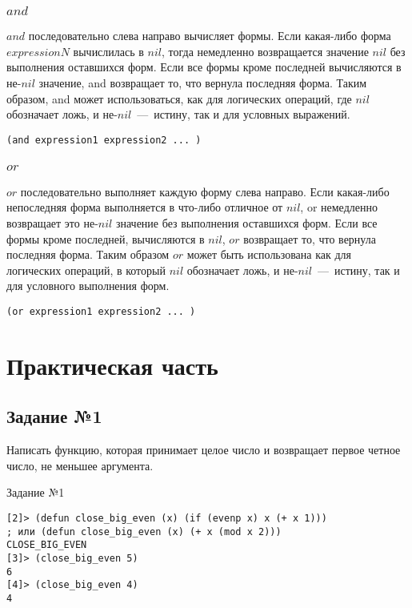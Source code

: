 \subsection{$and$}
$and$ последовательно слева направо вычисляет формы. Если какая-либо форма $expressionN$ вычислилась в $nil$, тогда немедленно возвращается значение $nil$ без выполнения оставшихся форм. Если все формы кроме последней вычисляются в не-$nil$ значение, and возвращает то, что вернула последняя форма. Таким образом, and может использоваться, как для логических операций, где $nil$ обозначает ложь, и не-$nil$~---~истину, так и для условных выражений.

\begin{code}
\begin{verbatim}
(and expression1 expression2 ... )
\end{verbatim}
\end{code}

\subsection{$or$}
$or$ последовательно выполняет каждую форму слева направо. Если какая-либо непоследняя форма выполняется в что-либо отличное от $nil$, or немедленно возвращает это не-$nil$ значение без выполнения оставшихся форм. Если все формы кроме последней, вычисляются в $nil$, $or$ возвращает то, что вернула последняя форма. Таким образом $or$ может быть использована как для логических операций, в который $nil$ обозначает ложь, и не-$nil$~---~истину, так и для условного выполнения форм.

\begin{code}
\begin{verbatim}
(or expression1 expression2 ... )
\end{verbatim}
\end{code}

\newpage

\chapter{Практическая часть}
\section{Задание №1}
Написать функцию, которая принимает целое число и возвращает первое четное число, не меньшее аргумента.

\begin{code}
\caption{Задание №1}
\label{code:bf2}
\begin{verbatim}
[2]> (defun close_big_even (x) (if (evenp x) x (+ x 1)))
; или (defun close_big_even (x) (+ x (mod x 2)))
CLOSE_BIG_EVEN
[3]> (close_big_even 5)
6
[4]> (close_big_even 4)
4
\end{verbatim}
\end{code}

